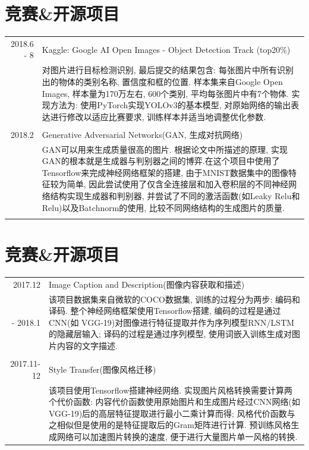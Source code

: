 \documentclass[a4paper,11pt]{article}
\begin{document}
\section{竞赛\&开源项目}
\begin{tabular}{r|p{11cm}}
\textsc{2018.6 - 8} & Kaggle: Google AI Open Images - Object Detection Track (top20\%)\\&\footnotesize{对图片进行目标检测识别, 最后提交的结果包含: 每张图片中所有识别出的物体的类别名称, 置信度和框的位置. 样本集来自Google Open Images, 样本量为170万左右, 600个类别, 平均每张图片中有7个物体. 实现方法为: 使用PyTorch实现YOLOv3的基本模型, 对原始网络的输出表达进行修改以适应比赛要求, 训练样本并适当地调整优化参数.}\\\multicolumn{2}{c}{} \\
\textsc{2018.2} & Generative Adversarial Networks(GAN, 生成对抗网络)\\&\footnotesize{GAN可以用来生成质量很高的图片. 根据论文中所描述的原理, 实现GAN的根本就是生成器与判别器之间的博弈.在这个项目中使用了Tensorflow来完成神经网络框架的搭建, 由于MNIST数据集中的图像特征较为简单, 因此尝试使用了仅含全连接层和加入卷积层的不同神经网络结构实现生成器和判别器, 并尝试了不同的激活函数(如Leaky Relu和Relu)以及Batchnorm的使用, 比较不同网络结构的生成图片的质量.}\\\multicolumn{2}{c}{} \\
\end{tabular}

\section{竞赛\&开源项目}
\begin{tabular}{r|p{11cm}}
\textsc{2017.12} & Image Caption and Description(图像内容获取和描述)\\{- 2018.1}&\footnotesize{该项目数据集来自微软的COCO数据集, 训练的过程分为两步: 编码和译码. 整个神经网络框架使用Tensorflow搭建, 编码的过程是通过CNN(如 VGG-19)对图像进行特征提取并作为序列模型RNN/LSTM的隐藏层输入; 译码的过程是通过序列模型, 使用词嵌入训练生成对图片内容的文字描述.  }\\\multicolumn{2}{c}{} \\
\textsc{2017.11-12} & Style Transfer(图像风格迁移)\\&\footnotesize{该项目使用Tensorflow搭建神经网络. 实现图片风格转换需要计算两个代价函数: 内容代价函数使用原始图片和生成图片经过CNN网络(如VGG-19)后的高层特征提取进行最小二乘计算而得; 风格代价函数与之相似但是使用的是特征提取后的Gram矩阵进行计算. 预训练风格生成网络可以加速图片转换的速度, 便于进行大量图片单一风格的转换. }
\end{tabular}
\end{document}
